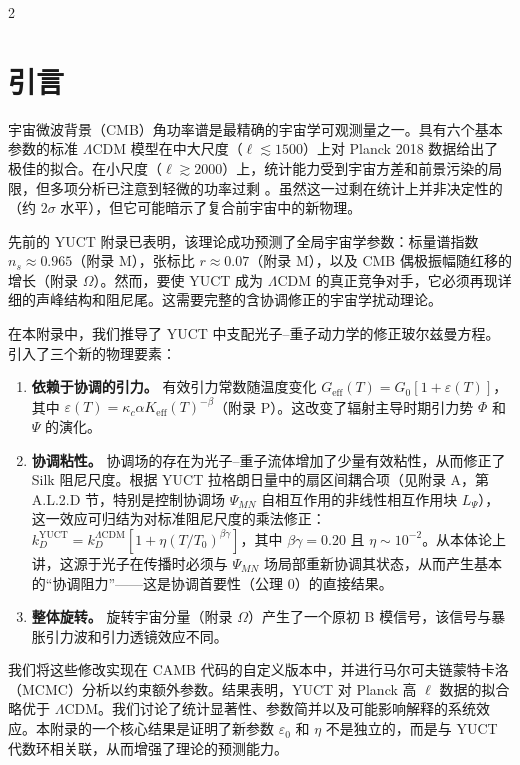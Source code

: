 \documentclass[11pt,a4paper]{article}
\begin{document}
	\begin{multicols}{2}
		
		\section{引言}
		
		宇宙微波背景（CMB）角功率谱是最精确的宇宙学可观测量之一。具有六个基本参数的标准 $\Lambda$CDM 模型在中大尺度（$\ell \lesssim 1500$）上对 Planck 2018 数据给出了极佳的拟合。在小尺度（$\ell \gtrsim 2000$）上，统计能力受到宇宙方差和前景污染的局限，但多项分析已注意到轻微的功率过剩 \cite{Planck2018}。虽然这一过剩在统计上并非决定性的（约 $2\sigma$ 水平），但它可能暗示了复合前宇宙中的新物理。
		
		先前的 YUCT 附录已表明，该理论成功预测了全局宇宙学参数：标量谱指数 $n_s \approx 0.965$（附录 M），张标比 $r \approx 0.07$（附录 M），以及 CMB 偶极振幅随红移的增长（附录 $\Omega$）。然而，要使 YUCT 成为 $\Lambda$CDM 的真正竞争对手，它必须再现详细的声峰结构和阻尼尾。这需要完整的含协调修正的宇宙学扰动理论。
		
		在本附录中，我们推导了 YUCT 中支配光子–重子动力学的修正玻尔兹曼方程。引入了三个新的物理要素：
		\begin{enumerate}
			\item \textbf{依赖于协调的引力。} 有效引力常数随温度变化 $G_{\mathrm{eff}}(T) = G_0[1 + \varepsilon(T)]$，其中 $\varepsilon(T) = \kappa_c \alpha K_{\mathrm{eff}}(T)^{-\beta}$（附录 P）。这改变了辐射主导时期引力势 $\Phi$ 和 $\Psi$ 的演化。
			\item \textbf{协调粘性。} 协调场的存在为光子–重子流体增加了少量有效粘性，从而修正了 Silk 阻尼尺度。根据 YUCT 拉格朗日量中的扇区间耦合项（见附录 A，第 A.L.2.D 节，特别是控制协调场 $\Psi_{MN}$ 自相互作用的非线性相互作用块 $L_{\Psi}$），这一效应可归结为对标准阻尼尺度的乘法修正：$k_D^{\text{YUCT}} = k_D^{\Lambda\text{CDM}} [1 + \eta (T/T_0)^{\beta\gamma}]$，其中 $\beta\gamma = 0.20$ 且 $\eta \sim 10^{-2}$。从本体论上讲，这源于光子在传播时必须与 $\Psi_{MN}$ 场局部重新协调其状态，从而产生基本的“协调阻力”——这是协调首要性（公理 0）的直接结果。
			\item \textbf{整体旋转。} 旋转宇宙分量（附录 $\Omega$）产生了一个原初 B 模信号，该信号与暴胀引力波和引力透镜效应不同。
		\end{enumerate}
		
		我们将这些修改实现在 CAMB 代码的自定义版本中，并进行马尔可夫链蒙特卡洛（MCMC）分析以约束额外参数。结果表明，YUCT 对 Planck 高 $\ell$ 数据的拟合略优于 $\Lambda$CDM。我们讨论了统计显著性、参数简并以及可能影响解释的系统效应。本附录的一个核心结果是证明了新参数 $\varepsilon_0$ 和 $\eta$ 不是独立的，而是与 YUCT 代数环相关联，从而增强了理论的预测能力。
		

\end{multicols}
\end{document}
